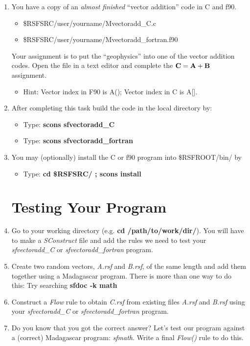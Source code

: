 \documentclass[18pt]{amsart}
\begin{document}
\begin{enumerate}
\item You have a copy of an {\it almost finished} ``vector addition'' code in C and f90.
\begin{itemize}
\item \$RSFSRC/user/yourname/Mvectoradd\_C.c
\item \$RSFSRC/user/yourname/Mvectoradd\_fortran.f90
\end{itemize}
Your assignment is to put the ``geophysics'' into one of the vector addition codes.  Open the file in a text editor and complete the ${\bf C=A+B}$ assignment.  
\begin{itemize}
\item Hint: Vector index in F90 is A(); Vector index in C is A[].\\
\end{itemize}

\item After completing this task build the code in the local directory by:
\begin{itemize}
\item Type: {\bf scons sfvectoradd\_C}
\item Type: {\bf scons sfvectoradd\_fortran}\\
\end{itemize}

\item You may (optionally) install the C or f90 program into \$RSFROOT/bin/ by 
\begin{itemize}
\item Type: {\bf cd \$RSFSRC/ ; scons install}\\
\end{itemize}

\section{Testing Your Program}

\item Go to your working directory (e.g. {\bf cd /path/to/work/dir/}).  You will have to make a {\it SConstruct} file and add the rules we need to test your {\it sfvectoradd\_C} or {\it sfvectoradd\_fortran} program.\\

\item Create two random vectors, {\it A.rsf} and {\it B.rsf}, of the same length and add them together using a Madagascar program. There is more than one way to do this: Try searching {\bf sfdoc -k math}\\

\item Construct a {\it Flow} rule to obtain {\it C.rsf} from existing files {\it A.rsf} and {\it B.rsf} using your {\it sfvectoradd\_C} or {\it sfvectoradd\_fortran} program.\\	

\item Do you know that you got the correct answer? Let's test our program against a (correct) Madagascar program: {\it sfmath}.  Write a final {\it Flow()} rule to do this.  
\end{enumerate}
\end{document}
